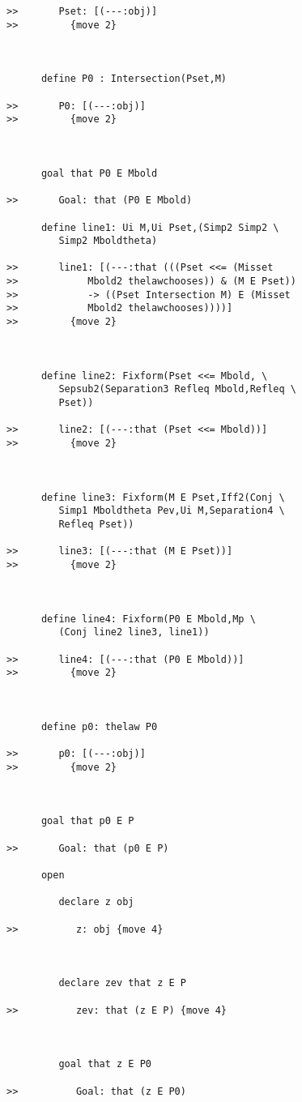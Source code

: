 \documentclass[12pt]{article}
\begin{document}
\begin{verbatim}
>>       Pset: [(---:obj)]
>>         {move 2}



      define P0 : Intersection(Pset,M)

>>       P0: [(---:obj)]
>>         {move 2}



      goal that P0 E Mbold

>>       Goal: that (P0 E Mbold)

      define line1: Ui M,Ui Pset,(Simp2 Simp2 \
         Simp2 Mboldtheta)

>>       line1: [(---:that (((Pset <<= (Misset
>>            Mbold2 thelawchooses)) & (M E Pset))
>>            -> ((Pset Intersection M) E (Misset
>>            Mbold2 thelawchooses))))]
>>         {move 2}



      define line2: Fixform(Pset <<= Mbold, \
         Sepsub2(Separation3 Refleq Mbold,Refleq \
         Pset))

>>       line2: [(---:that (Pset <<= Mbold))]
>>         {move 2}



      define line3: Fixform(M E Pset,Iff2(Conj \
         Simp1 Mboldtheta Pev,Ui M,Separation4 \
         Refleq Pset))

>>       line3: [(---:that (M E Pset))]
>>         {move 2}



      define line4: Fixform(P0 E Mbold,Mp \
         (Conj line2 line3, line1))

>>       line4: [(---:that (P0 E Mbold))]
>>         {move 2}



      define p0: thelaw P0

>>       p0: [(---:obj)]
>>         {move 2}



      goal that p0 E P

>>       Goal: that (p0 E P)

      open

         declare z obj

>>          z: obj {move 4}



         declare zev that z E P

>>          zev: that (z E P) {move 4}



         goal that z E P0

>>          Goal: that (z E P0)


\end{verbatim}
\end{document}
